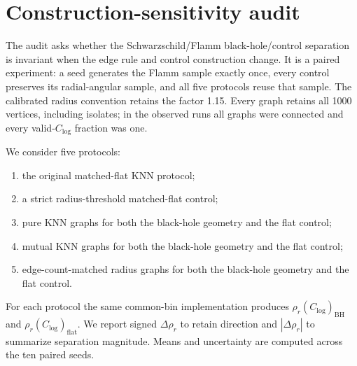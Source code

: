 \documentclass[11pt,a4paper]{article}
\begin{document}
\section{Construction-sensitivity audit}
\label{sec:construction-audit}

The audit asks whether the Schwarzschild/Flamm black-hole/control separation is invariant when the edge rule and control construction change. It is a paired experiment: a seed generates the Flamm sample exactly once, every control preserves its radial-angular sample, and all five protocols reuse that sample. The calibrated radius convention retains the factor 1.15. Every graph retains all 1000 vertices, including isolates; in the observed runs all graphs were connected and every valid-$C_{\log}$ fraction was one.

We consider five protocols:
\begin{enumerate}
    \item the original matched-flat KNN protocol;
    \item a strict radius-threshold matched-flat control;
    \item pure KNN graphs for both the black-hole geometry and the flat control;
    \item mutual KNN graphs for both the black-hole geometry and the flat control;
    \item edge-count-matched radius graphs for both the black-hole geometry and
    the flat control.
\end{enumerate}

For each protocol the same common-bin implementation produces $\rho_r(C_{\log})_{\mathrm{BH}}$ and $\rho_r(C_{\log})_{\mathrm{flat}}$. We report signed $\Delta\rho_r$ to retain direction and $|\Delta\rho_r|$ to summarize separation magnitude. Means and uncertainty are computed across the ten paired seeds.

\begin{table}[H]
\centering
\caption{
Summary of the graph-construction and matched-control protocols used in the
construction-sensitivity audit.
}
\label{tab:protocol-summary}
\small
\setlength{\tabcolsep}{4pt}
\end{table}
\end{document}
